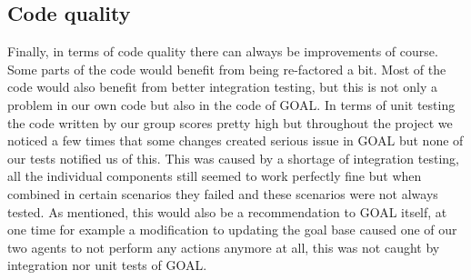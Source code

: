 \documentclass[11pt]{article}
\begin{document}
\subsection{Code quality}
Finally, in terms of code quality there can always be improvements of course. Some parts of the code would benefit from being re-factored a bit. Most of the code would also benefit from better integration testing, but this is not only a problem in our own code but also in the code of GOAL. In terms of unit testing the code written by our group scores pretty high but throughout the project we noticed a few times that some changes created serious issue in GOAL but none of our tests notified us of this. This was caused by a shortage of integration testing, all the individual components still seemed to work perfectly fine but when combined in certain scenarios they failed and these scenarios were not always tested. As mentioned, this would also be a recommendation to GOAL itself, at one time for example a modification to updating the goal base caused one of our two agents to not perform any actions anymore at all, this was not caught by integration nor unit tests of GOAL.

\clearpage
\printglossaries
\end{document}
